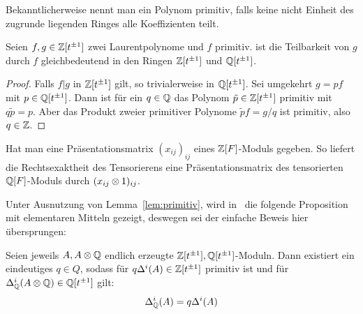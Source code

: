 	 Bekanntlicherweise nennt man ein Polynom primitiv, falls keine nicht Einheit des zugrunde liegenden Ringes alle Koeffizienten teilt. 
	 \begin{lem}
	 \label{lem:primitiv}
	 	Seien $f,g \in \mathbb{Z}[t^{\pm 1}]$ zwei Laurentpolynome und $f$ primitiv. ist die Teilbarkeit von $g$ durch $f$ gleichbedeutend in den Ringen $\mathbb{Z}[t^{\pm 1}]$ und $\mathbb{Q}[t^{\pm 1}]$.
	 \end{lem}
	 \begin{proof}
	 	Falls $f|g$ in $\mathbb{Z}[t^{\pm 1}] $ gilt, so trivialerweise in $\mathbb{Q}[t^{\pm 1}]$. Sei umgekehrt $g=pf$ mit $p \in \mathbb{Q}[t^{\pm 1}]$. Dann ist für ein $q \in \mathbb{Q}$ das Polynom $\tilde p \in \mathbb{Z}[t^{\pm 1}]$ primitiv mit $q\tilde p = p$. Aber das Produkt zweier primitiver Polynome $\tilde p f = g/q$ ist primitiv, also $q \in \mathbb{Z}$.
	 \end{proof}

	 \begin{bem}
	 	Hat man eine Präsentationsmatrix $(x_{ij})_{ij}$ eines $\mathbb{Z}[F]$-Moduls gegeben. So liefert die Rechtsexaktheit des Tensorierens eine Präsentationsmatrix des tensorierten $\mathbb{Q}[F]$-Moduls durch $(x_{ij} \otimes 1)_{ij}$.
	 \end{bem}

	 Unter Ausnutzung von Lemma~\ref{lem:primitiv}, wird in~\cite[Lemma~2.2]{Shinohara.1972} die folgende Proposition mit elementaren Mitteln gezeigt, deswegen sei der einfache Beweis hier übersprungen:
	 \begin{prop}
	 	\label{prop:tensoring}
	 	Seien jeweils $A,A\otimes \mathbb{Q}$ endlich erzeugte $\mathbb{Z}[t^{\pm 1}], \mathbb{Q}[t^{\pm 1}]$-Moduln. Dann existiert ein eindeutiges $q\in Q$, sodass für $q\Delta^i(A) \in \mathbb{Z}[t^{\pm 1}]$ primitiv ist und für $\Delta^i_{\mathbb{Q}}(A\otimes \mathbb{Q}) \in \mathbb{Q}[t^{\pm 1}]$ gilt:
	 	\[
	 		 \Delta^i_{\mathbb{Q}}(A) = q\Delta^i(A) 
	 	\]
	 \end{prop}